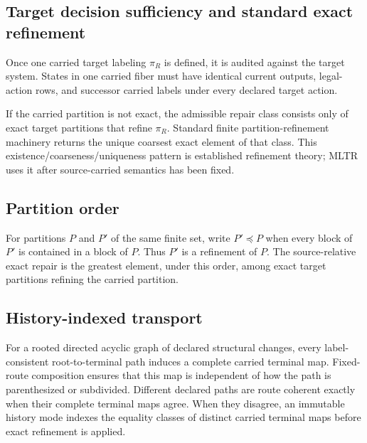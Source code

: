 \subsection{Target decision sufficiency and standard exact refinement}
Once one carried target labeling $\pi_R$ is defined, it is audited against the target system. States in one carried fiber must have identical current outputs, legal-action rows, and successor carried labels under every declared target action.

If the carried partition is not exact, the admissible repair class consists only of exact target partitions that refine $\pi_R$. Standard finite partition-refinement machinery returns the unique coarsest exact element of that class. This existence/coarseness/uniqueness pattern is established refinement theory; MLTR uses it after source-carried semantics has been fixed.

\subsection{Partition order}
For partitions $P$ and $P'$ of the same finite set, write $P'\preceq P$ when every block of $P'$ is contained in a block of $P$. Thus $P'$ is a refinement of $P$. The source-relative exact repair is the greatest element, under this order, among exact target partitions refining the carried partition.

\subsection{History-indexed transport}
For a rooted directed acyclic graph of declared structural changes, every label-consistent root-to-terminal path induces a complete carried terminal map. Fixed-route composition ensures that this map is independent of how the path is parenthesized or subdivided. Different declared paths are route coherent exactly when their complete terminal maps agree. When they disagree, an immutable history mode indexes the equality classes of distinct carried terminal maps before exact refinement is applied.
